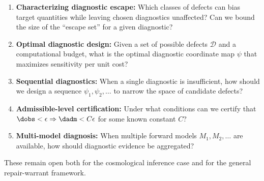 \begin{enumerate}
\item \textbf{Characterizing diagnostic escape:} Which classes of defects can bias target quantities while leaving chosen diagnostics unaffected? Can we bound the size of the ``escape set'' for a given diagnostic?

\item \textbf{Optimal diagnostic design:} Given a set of possible defects $\mathcal{D}$ and a computational budget, what is the optimal diagnostic coordinate map $\psi$ that maximizes sensitivity per unit cost?

\item \textbf{Sequential diagnostics:} When a single diagnostic is insufficient, how should we design a sequence $\psi_1, \psi_2, \ldots$ to narrow the space of candidate defects?

\item \textbf{Admissible-level certification:} Under what conditions can we certify that $\dobs < \epsilon \Rightarrow \dadm < C\epsilon$ for some known constant $C$?

\item \textbf{Multi-model diagnosis:} When multiple forward models $M_1, M_2, \ldots$ are available, how should diagnostic evidence be aggregated?
\end{enumerate}

These remain open both for the cosmological inference case and for the general repair-warrant framework.
